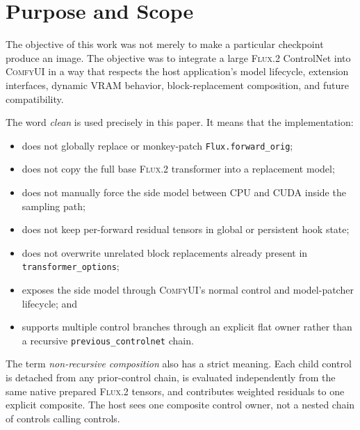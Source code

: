 \documentclass[11pt]{article}
\newcommand{\FluxTwo}{\textsc{Flux.2}}
\newcommand{\ComfyUI}{\textsc{ComfyUI}}
\newcommand{\code}[1]{\texttt{#1}}
\begin{document}
\begin{abstract}
The final frozen design also uses a thread-safe lazy checkpoint handle. Text encoding completes before the 7.7~GiB side model is materialized during sampling-model discovery, resolving model-lifecycle pressure while preserving one shared owner across shallow copies and Orchestrator branches. The frozen scope is control-image operation on the \FluxTwo{}-dev family, with single-control and two-branch explicit non-recursive composition. Inpainting, reference-latent parity, generalized branch counts, and substantive multi-GPU work remain intentionally outside this milestone.
\end{abstract}

\tableofcontents
\newpage

\section{Purpose and Scope}

The objective of this work was not merely to make a particular checkpoint produce an image. The objective was to integrate a large \FluxTwo{} ControlNet into \ComfyUI{} in a way that respects the host application's model lifecycle, extension interfaces, dynamic VRAM behavior, block-replacement composition, and future compatibility.

The word \emph{clean} is used precisely in this paper. It means that the implementation:

\begin{itemize}
  \item does not globally replace or monkey-patch \code{Flux.forward\_orig};
  \item does not copy the full base \FluxTwo{} transformer into a replacement model;
  \item does not manually force the side model between CPU and CUDA inside the sampling path;
  \item does not keep per-forward residual tensors in global or persistent hook state;
  \item does not overwrite unrelated block replacements already present in \code{transformer\_options};
  \item exposes the side model through \ComfyUI{}'s normal control and model-patcher lifecycle; and
  \item supports multiple control branches through an explicit flat owner rather than a recursive \code{previous\_controlnet} chain.
\end{itemize}

The term \emph{non-recursive composition} also has a strict meaning. Each child control is detached from any prior-control chain, is evaluated independently from the same native prepared \FluxTwo{} tensors, and contributes weighted residuals to one explicit composite. The host sees one composite control owner, not a nested chain of controls calling controls.
\end{document}
